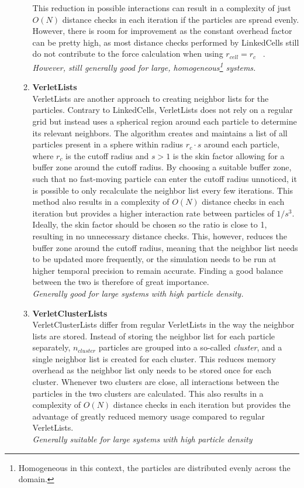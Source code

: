 \begin{enumerate}[label=\textbf{\arabic*.}]
\begin{enumerate}
                        This reduction in possible interactions can result in a complexity of just $O(N)$ distance checks in each iteration if the particles are spread evenly. However, there is room for improvement as the constant overhead factor can be pretty high, as most distance checks performed by LinkedCells still do not contribute to the force calculation when using $r_{cell}=r_c$ ~\cite{GRATL2019748}.\\
                        \textit{However, still generally good for large, homogeneous\footnote{Homogeneous in this context, the particles are distributed evenly across the domain.} systems.}

                  \item \textbf{VerletLists} \\
                        VerletLists are another approach to creating neighbor lists for the particles. Contrary to LinkedCells, VerletLists does not rely on a regular grid but instead uses a spherical region around each particle to determine its relevant neighbors. The algorithm creates and maintains a list of all particles present in a sphere within radius $r_c \cdot s$ around each particle, where $r_c$ is the cutoff radius and $s>1$ is the skin factor allowing for a buffer zone around the cutoff radius.
                        By choosing a suitable buffer zone, such that no fast-moving particle can enter the cutoff radius unnoticed, it is possible to only recalculate the neighbor list every few iterations. This method also results in a complexity of $O(N)$ distance checks in each iteration but provides a higher interaction rate between particles of $1/s^3$. Ideally, the skin factor should be chosen so the ratio is close to 1, resulting in no unnecessary distance checks. This, however, reduces the buffer zone around the cutoff radius, meaning that the neighbor list needs to be updated more frequently, or the simulation needs to be run at higher temporal precision to remain accurate. Finding a good balance between the two is therefore of great importance.\\
                        \textit{Generally good for large systems with high particle density.}

                  \item \textbf{VerletClusterLists} \\
                        VerletClusterLists differ from regular VerletLists in the way the neighbor lists are stored. Instead of storing the neighbor list for each particle separately, $n_{cluster}$ particles are grouped into a so-called \emph{cluster}, and a single neighbor list is created for each cluster. This reduces memory overhead as the neighbor list only needs to be stored once for each cluster. Whenever two clusters are close, all interactions between the particles in the two clusters are calculated. This also results in a complexity of $O(N)$ distance checks in each iteration but provides the advantage of greatly reduced memory usage compared to regular VerletLists.\\
                        \textit{Generally suitable for large systems with high particle density}


\end{enumerate}
\end{enumerate}
